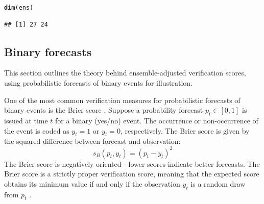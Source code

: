 \documentclass[article]{jss}\usepackage{graphicx, color}
\makeatletter
\newcommand{\hlfunctioncall}[1]{\textcolor[rgb]{0,0.501960784313725,0.752941176470588}{\textbf{#1}}}%
\newenvironment{kframe}{%
 \def\at@end@of@kframe{}%
 \ifinner\ifhmode%
  \def\at@end@of@kframe{\end{minipage}}%
  \begin{minipage}{\columnwidth}%
 \fi\fi%
 \def\FrameCommand##1{\hskip\@totalleftmargin \hskip-\fboxsep
 \colorbox{shadecolor}{##1}\hskip-\fboxsep
     \hskip-\linewidth \hskip-\@totalleftmargin \hskip\columnwidth}%
 \MakeFramed {\advance\hsize-\width
   \@totalleftmargin\z@ \linewidth\hsize
   \@setminipage}}%
 {\par\unskip\endMakeFramed%
 \at@end@of@kframe}
\newenvironment{knitrout}{}{} %
\makeatother
\begin{document}
\begin{knitrout}
\color{fgcolor}\begin{kframe}
\begin{alltt}
\hlfunctioncall{dim}(ens)
\end{alltt}
\begin{verbatim}
## [1] 27 24
\end{verbatim}
\end{kframe}
\end{knitrout}



\subsection{Binary forecasts}

This section outlines the theory behind ensemble-adjusted verification scores, using probabilistic forecasts of binary events for illustration.  

One of the most common verification measures for probabilistic forecasts of binary events is the Brier score \citep{brier1950verification}.
Suppose a probability forecast $p_t \in [0,1]$ is issued at time $t$ for a binary (yes/no) event.
The occurrence or non-occurrence of the event is coded as $y_t=1$ or $y_t=0$, respectively. 
The Brier score is given by the squared difference between forecast and observation:
%
\begin{equation}
s_{B}(p_t, y_t) = (p_t - y_t)^2
\end{equation}
%
The Brier score is negatively oriented - lower scores indicate better forecasts.
The Brier score is a strictly proper verification score, meaning that the expected score obtains its minimum value if and only if the observation $y_t$ is a random draw from $p_t$ \citep{gneiting2007strictly}.
\end{document}
